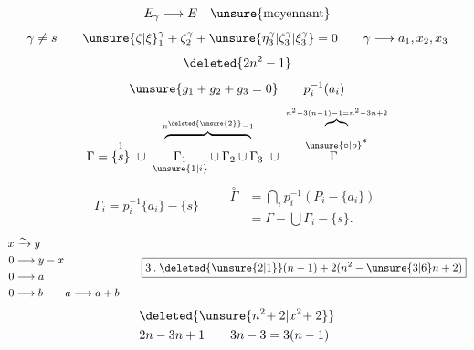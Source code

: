 \[
 E_\gamma\longrightarrow E\quad\text{\unsure{moyennant}}
\]
\[
 \gamma\ne s\qquad {\unsure{\zeta|\xi}}_1^\gamma+\zeta_2^\gamma+\unsure{\eta_3^\gamma|\zeta_3^\gamma|\xi_3^\gamma}=0
 \qquad \gamma\longrightarrow a_1,x_2,x_3
\]
\[
 \deleted{2n^2-1}
\]
\[
 \unsure{g_1+g_2+g_3=0}\qquad p_i^{-1}(a_i)
\]
\[
 \overset{\phantom{1}}{\Gamma}=
 \overset{1}{\{s\}}\ \cup\
 \overset{\overbrace{\phantom{\Gamma_1\ \cup\ \Gamma_2\ \cup\ \Gamma_3}}^{n^{\deleted{\unsure{2}}}-1}}
 {\underset{\unsure{1|i}}{\Gamma_1}\cup \Gamma_2\cup \Gamma_3}\ \cup\
 \overset{\overbrace{\phantom{\Gamma^{*}}}^{n^2-3(n-1)-1=n^2-3n+2}}
 {\overset{\unsure{\circ|o}}{\Gamma}^{*}}
\]
\[
 \Gamma_i=p_i^{-1}\{a_i\}-\{s\}
 \qquad\begin{aligned}
 \overset{\circ}{\Gamma}&=\bigcap_i p_i^{-1}(P_i-\{a_i\})\\
 &=\Gamma-\bigcup \Gamma_i-\{s\}.
 \end{aligned}
\]
\[
 \begin{aligned}
 x&\xrightarrow{\sim}y\\0&\longrightarrow y-x\\0&\longrightarrow a\\
 0&\longrightarrow b\qquad a\longrightarrow a+b
 \end{aligned}
 \qquad
 \boxed{3\mathbin{.}\deleted{\unsure{2|1}}(n-1)+2(n^2-\unsure{3|6}n+2)}
\]
\[
 \begin{aligned}
 &\deleted{\unsure{n^2\!+2|x^2\!+2}}\\
 &2n-3n+1\qquad 3n-3=3(n-1)
 \end{aligned}
\]
